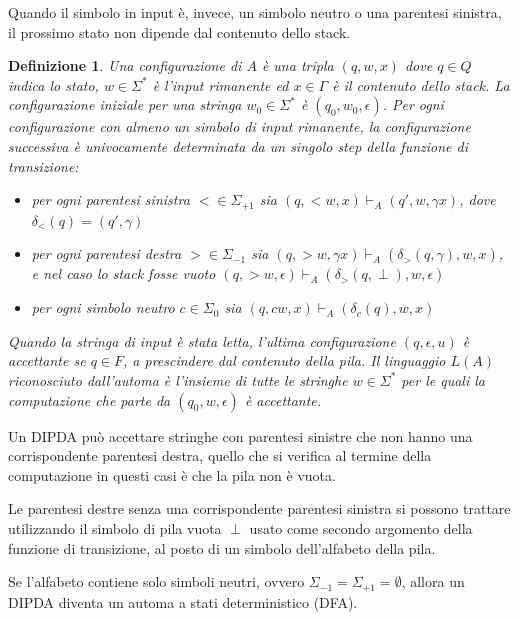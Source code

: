 \documentclass[a4paper,12pt]{report}
\newtheorem{definition}{Definizione}[chapter]
\theoremstyle{propositionstyle}
\begin{document}
    Quando il simbolo in input è, invece, un simbolo neutro o una parentesi sinistra, il prossimo stato non dipende dal contenuto dello stack.

    \begin{definition}
        \label{def:configuration}
        Una configurazione di $A$ è una tripla $\left(q, w, x\right)$ dove $q \in Q$ indica lo stato, $w \in \Sigma^*$ è l'input rimanente ed  $x \in \Gamma$ è il contenuto dello stack.
        La configurazione iniziale per una stringa $w_0 \in \Sigma^*$ è $\left(q_0, w_0, \epsilon\right)$.
        Per ogni configurazione con almeno un simbolo di input rimanente, la configurazione successiva è univocamente determinata da un singolo step della funzione di transizione:
        \begin{itemize}
            \item per ogni parentesi sinistra $< \in \Sigma_{+1}$ sia $(q, <w, x) \vdash_{A} (q', w, \gamma x)$, dove $\delta_{<}(q) = (q', \gamma)$
            \item per ogni parentesi destra $> \in \Sigma_{-1}$ sia $(q, >w, \gamma x) \vdash_{A} (\delta_{>}(q, \gamma), w, x)$, e nel caso lo stack fosse vuoto $(q, >w, \epsilon) \vdash_{A} (\delta_{>}(q, \perp), w, \epsilon)$
            \item per ogni simbolo neutro $c \in \Sigma_{0}$ sia $(q, cw, x) \vdash_{A} (\delta_{c}(q), w, x)$
        \end{itemize}

        Quando la stringa di input è stata letta, l'ultima configurazione $\left(q, \epsilon, u\right)$ è accettante se $q \in F$, a prescindere dal contenuto della pila.
        Il linguaggio $L\left(A\right)$ riconosciuto dall'automa è l'insieme di tutte le stringhe $w \in \Sigma^*$ per le quali la computazione che parte da $\left(q_0, w, \epsilon\right)$ è accettante.
    \end{definition}

    Un DIPDA può accettare stringhe con parentesi sinistre che non hanno una corrispondente parentesi destra, quello che si verifica al termine della computazione in questi casi è che la pila non è vuota.

    Le parentesi destre senza una corrispondente parentesi sinistra si possono trattare utilizzando il simbolo di pila vuota $\perp$ usato come secondo argomento della funzione di transizione, al posto di un simbolo dell'alfabeto della pila.

    Se l'alfabeto contiene solo simboli neutri, ovvero $\Sigma_{-1} = \Sigma_{+1} = \emptyset$, allora un DIPDA diventa un automa a stati deterministico (DFA).
\end{document}
